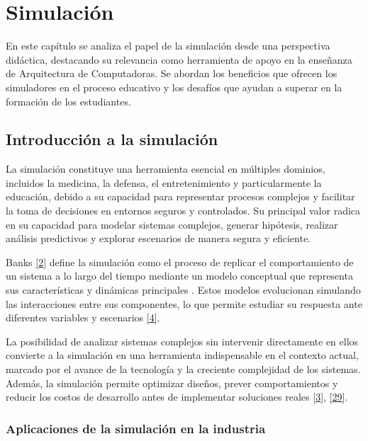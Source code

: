 \documentclass[12pt,oneside]{templates/unerthesis}
\begin{document}
\hypertarget{simulacion}{%
\chapter{Simulación}\label{simulacion}}

En este capítulo se analiza el papel de la simulación desde una perspectiva didáctica, destacando su relevancia como herramienta de apoyo en la enseñanza de Arquitectura de Computadoras. Se abordan los beneficios que ofrecen los simuladores en el proceso educativo y los desafíos que ayudan a superar en la formación de los estudiantes.

\hypertarget{introducciuxf3n-a-la-simulaciuxf3n}{%
\section{Introducción a la simulación}\label{introducciuxf3n-a-la-simulaciuxf3n}}

La simulación constituye una herramienta esencial en múltiples dominios, incluidos la medicina, la defensa, el entretenimiento y particularmente la educación, debido a su capacidad para representar procesos complejos y facilitar la toma de decisiones en entornos seguros y controlados. Su principal valor radica en su capacidad para modelar sistemas complejos, generar hipótesis, realizar análisis predictivos y explorar escenarios de manera segura y eficiente.

Banks \protect\hyperlink{ref-banks_discrete-event_2010}{{[}2{]}} define la simulación como el proceso de replicar el comportamiento de un sistema a lo largo del tiempo mediante un modelo conceptual que representa sus características y dinámicas principales . Estos modelos evolucionan simulando las interacciones entre sus componentes, lo que permite estudiar su respuesta ante diferentes variables y escenarios \protect\hyperlink{ref-robinson_simulation_2014}{{[}4{]}}.

La posibilidad de analizar sistemas complejos sin intervenir directamente en ellos convierte a la simulación en una herramienta indispensable en el contexto actual, marcado por el avance de la tecnología y la creciente complejidad de los sistemas. Además, la simulación permite optimizar diseños, prever comportamientos y reducir los costos de desarrollo antes de implementar soluciones reales \protect\hyperlink{ref-law_simulation_2015}{{[}3{]}}, \protect\hyperlink{ref-zeigler_theory_2000}{{[}29{]}}.

\hypertarget{aplicaciones-de-la-simulaciuxf3n-en-la-industria}{%
\subsection{Aplicaciones de la simulación en la industria}\label{aplicaciones-de-la-simulaciuxf3n-en-la-industria}}
\end{document}
